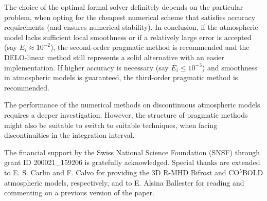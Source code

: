 \documentclass[iop,numberedappendix,twocolappendix,twocolumn]{emulateapj}
\begin{document}


The choice of the optimal formal solver definitely depends on the particular problem,
when opting for the cheapest numerical scheme that satisfies accuracy requirements (and ensures numerical stability).
In conclusion, if the atmospheric model lacks sufficient local smoothness or if a relatively large error is accepted (say $E_i\approx10^{-2}$),
the second-order pragmatic method is recommended and the DELO-linear method still represents a solid alternative with an easier implementation.
If higher accuracy is necessary (say $E_i\le10^{-3}$) and smoothness in atmospheric models %
is guaranteed,
the third-order pragmatic method is recommended.

The performance of the numerical methods on discontinuous atmospheric models
requires a deeper investigation.
However, the structure of pragmatic methods might also be suitable to switch to suitable techniques,
when facing discontinuities in the integration interval.

%
\acknowledgments
%
The financial support by the Swiss National Science Foundation (SNSF) through grant ID 200021\_159206 is gratefully acknowledged.
Special thanks are extended to E. S. Carlin and F. Calvo for providing the 3D R-MHD Bifrost and CO$^5$BOLD atmospheric models, respectively, and to E. Alsina Ballester  
for reading and commenting on a previous version of the paper.
%
\appendix
%
%
\end{document}
